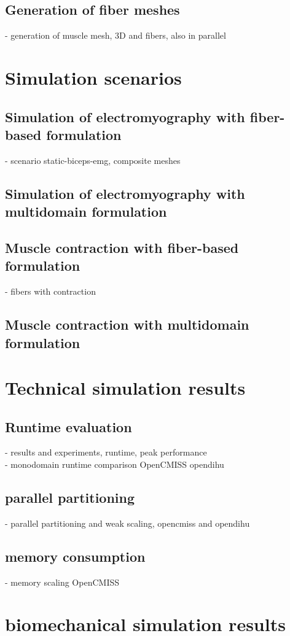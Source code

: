     \section{Generation of fiber meshes}
    - generation of muscle mesh, 3D and fibers, also in parallel
  
  \chapter{Simulation scenarios}
    \section{Simulation of electromyography with fiber-based formulation}
      - scenario static-biceps-emg, composite meshes
    \section{Simulation of electromyography with multidomain formulation}
    \section{Muscle contraction with fiber-based formulation}
      - fibers with contraction
    \section{Muscle contraction with multidomain formulation}
  \chapter{Technical simulation results}
    \section{Runtime evaluation}
    - results and experiments, runtime, peak performance\\
    - monodomain runtime comparison OpenCMISS opendihu
    \section{parallel partitioning}
    - parallel partitioning and weak scaling, opencmiss and opendihu 
    \section{memory consumption}
    - memory scaling OpenCMISS
  \chapter{biomechanical simulation results}
